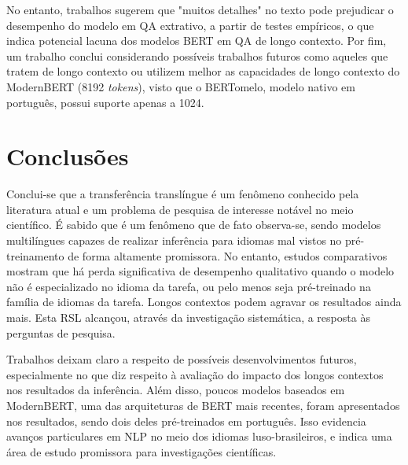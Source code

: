 \documentclass[12pt,a4paper]{article}
\begin{document}
No entanto, trabalhos \cite{le} sugerem que "muitos detalhes" no texto pode prejudicar o desempenho do modelo em QA extrativo, a partir de testes empíricos, o que indica potencial lacuna dos modelos BERT em QA de longo contexto. Por fim, um trabalho \cite{bertomelo} conclui considerando possíveis trabalhos futuros como aqueles que tratem de longo contexto ou utilizem melhor as capacidades de longo contexto do ModernBERT (8192 \textit{tokens}), visto que o BERTomelo, modelo nativo em português, possui suporte apenas a 1024.

\section{Conclusões}
Conclui-se que a transferência translíngue é um fenômeno conhecido pela literatura atual e um problema de pesquisa de interesse notável no meio científico. É sabido que é um fenômeno que de fato observa-se, sendo modelos multilíngues capazes de realizar inferência para idiomas mal vistos no pré-treinamento de forma altamente promissora. No entanto, estudos comparativos mostram que há perda significativa de desempenho qualitativo quando o modelo não é especializado no idioma da tarefa, ou pelo menos seja pré-treinado na família de idiomas da tarefa. Longos contextos podem agravar os resultados ainda mais. Esta RSL alcançou, através da investigação sistemática, a resposta às perguntas de pesquisa.

Trabalhos deixam claro a respeito de possíveis desenvolvimentos futuros, especialmente no que diz respeito à avaliação do impacto dos longos contextos nos resultados da inferência. Além disso, poucos modelos baseados em ModernBERT, uma das arquiteturas de BERT mais recentes, foram apresentados nos resultados, sendo dois deles pré-treinados em português. Isso evidencia avanços particulares em NLP no meio dos idiomas luso-brasileiros, e indica uma área de estudo promissora para investigações científicas.



\end{document}
